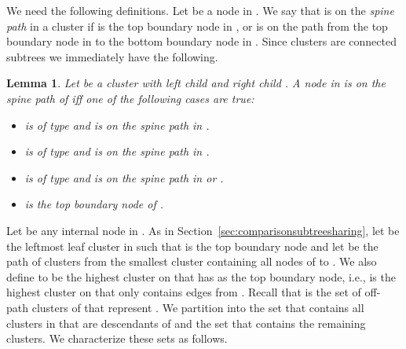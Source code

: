 \documentclass [11pt]{article}
\newtheorem{lemma}{Lemma}
\begin{document}
We need the following definitions. Let  be a node in . We say that  is on the \emph{spine path} in a cluster  if  is the top boundary node in , or  is on the path from the top boundary node in  to the bottom boundary node in . Since clusters are connected subtrees we immediately have the following.

\begin{lemma}\label{lem:spinepath}
Let  be a cluster with left child  and right child . A node  in  is on the spine path of  iff one of the following cases are true: 
\begin{itemize}
\item  is of type  and  is on the spine path in .
\item  is of type  and  is on the spine path in .
\item  is of type   and  is on the spine path in  or . \item  is the top boundary node of .
\end{itemize}
\end{lemma}

Let  be any internal node in . As in Section~\ref{sec:comparisonsubtreesharing}, let  be the leftmost leaf cluster in  such that  is the top boundary node and let  be the path of clusters from the smallest cluster  containing all nodes of  to . We also define  to be the highest cluster on  that has  as the top boundary node, i.e.,  is the highest cluster on  that only contains edges from . Recall that  is the set of  off-path  clusters of  that represent . We partition  into the set  that contains all clusters in  that are descendants of  and the set  that contains the remaining clusters. We characterize these sets as follows.
\end{document}
